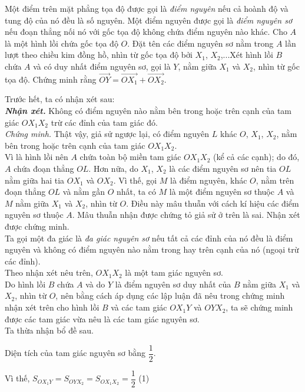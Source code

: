 \begin{bt}%
	Một điểm trên mặt phẳng tọa độ được gọi là \textit{điểm nguyên} nếu cả hoành độ và tung độ của nó đều là số nguyên. Một điểm nguyên được gọi là \textit{điểm nguyên sơ} nếu đoạn thẳng nối nó với gốc tọa độ không chứa điểm nguyên nào khác. Cho $A$ là một hình lồi chứa gốc tọa độ $O$. Đặt tên các điểm nguyên sơ nằm trong $A$ lần lượt theo chiều kim đồng hồ, nhìn từ gốc tọa độ bởi $X_1$, $X_2$,...Xét hình lồi $B$ chứa $A$ và có duy nhất điểm nguyên sơ, gọi là $Y$, nằm giữa $X_1$ và $X_2$, nhìn từ gốc tọa độ. Chứng minh rằng $\overrightarrow{OY}=\overrightarrow{OX_1}+\overrightarrow{OX_2}$.
\loigiai
	{Trước hết, ta có nhận xét sau:\\
	\textit{\textbf{Nhận xét.}} Không có điểm nguyên nào nằm bên trong hoặc trên cạnh của tam giác $OX_1X_2$ trừ các đỉnh của tam giác đó.\\
	\textit{Chứng minh.} Thật vậy, giả sử ngược lại, có điểm nguyên $L$ khác $O$, $X_1$, $X_2$, nằm bên trong hoặc trên cạnh của tam giác $OX_1X_2$.\\
	Vì là hình lồi nên $A$ chứa toàn bộ miền tam giác $OX_1X_2$ (kể cả các cạnh); do đó, $A$ chứa đoạn thẳng $OL$. Hơn nữa, do $X_1$, $X_2$ là các điểm nguyên sơ nên tia $OL$ nằm giữa hai tia $OX_1$ và $OX_2$. Vì thế, gọi $M$ là điểm nguyên, khác $O$, nằm trên đoạn thẳng $OL$ và nằm gần $O$ nhất, ta có $M$ là một điểm nguyên sơ thuộc $A$ và $M$ nằm giữa $X_1$ và $X_2$, nhìn từ $O$. Điều này mâu thuẫn với cách kí hiệu các điểm nguyên sơ thuộc $A$. Mâu thuẫn nhận được chứng tỏ giả sử ở trên là sai. Nhận xét được chứng minh.\\
	Ta gọi một đa giác là \textit{đa giác nguyên sơ} nếu tất cả các đỉnh của nó đều là điểm nguyên và không có điểm nguyên nào nằm trong hay trên cạnh của nó (ngoại trừ các đỉnh).\\
	Theo nhận xét nêu trên, $OX_1X_2$ là một tam giác nguyên sơ.\\
	Do hình lồi $B$ chứa $A$ và do $Y$ là điểm nguyên sơ duy nhất của $B$ nằm giữa $X_1$ và $X_2$, nhìn từ $O$, nên bằng cách áp dụng các lập luận đã nêu trong chứng minh nhận xét trên cho hình lồi $B$ và các tam giác $OX_1Y$ và $OYX_2$, ta sẽ chứng minh được các tam giác vừa nêu là các tam giác nguyên sơ. \\
	Ta thừa nhận bổ đề sau.
	\begin{bode}
		Diện tích của tam giác nguyên sơ bằng $\dfrac{1}{2}$.
	\end{bode}
	Vì thế, $S_{OX_1Y}=S_{OYX_2}=S_{OX_1X_2}=\dfrac{1}{2}$ \hfill (1)\\
}
\end{bt}
